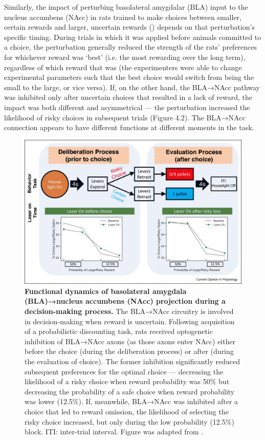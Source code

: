 \begin{refsection}
Similarly, the impact of perturbing basolateral amygdalar (BLA) input to the nucleus accumbens (NAcc) in rats trained to make choices between smaller, certain rewards and larger, uncertain rewards (\cite{bercovici2018a}) depends on that perturbation’s specific timing. During trials in which it was applied before animals committed to a choice, the perturbation generally reduced the strength of the rats’ preferences for whichever reward was ‘best’ (i.e. the most rewarding over the long term), regardless of which reward that was (the experimenters were able to change experimental parameters such that the best choice would switch from being the small to the large, or vice versa). If, on the other hand, the BLA→NAcc pathway was inhibited only after uncertain choices that resulted in a lack of reward, the impact was both different and asymmetrical --- the perturbation increased the likelihood of risky choices in subsequent trials (Figure 4.2). The BLA→NAcc connection appears to have different functions at different moments in the task.

\begin{figure}
\includegraphics[width=\linewidth]{lin_2021_review_figs/1-s2.0-S2468867320301693-gr2_lrg.jpg}
\caption{\textbf{Functional dynamics of basolateral amygdala (BLA)→nucleus accumbens (NAcc) projection during a decision-making process.} The BLA→NAcc circuitry is involved in decision-making when reward is uncertain. Following acquisition of a probabilistic discounting task, rats received optogenetic inhibition of BLA→NAcc axons (as those axons enter NAcc) either before the choice (during the deliberation process) or after (during the evaluation of choice). The former inhibition significantly reduced subsequent preferences for the optimal choice --- decreasing the likelihood of a risky choice when reward probability was 50\% but decreasing the probability of a safe choice when reward probability was lower (12.5\%). If, meanwhile, BLA→NAcc was inhibited after a choice that led to reward omission, the likelihood of selecting the risky choice increased, but only during the low probability (12.5\%) block. ITI: inter-trial interval. Figure was adapted from \cite{bercovici2018a}.}
\label{fig:wrapfig}
\end{figure}


\end{refsection}
